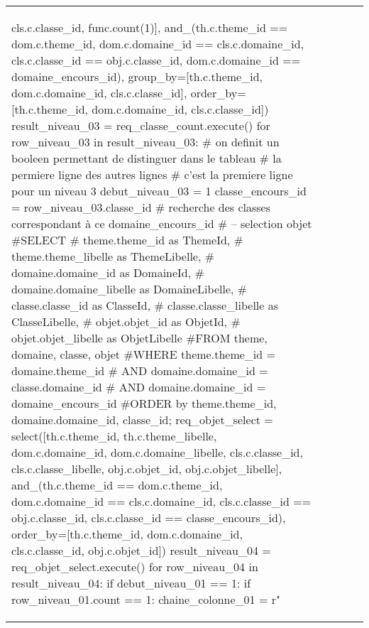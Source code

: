 \documentclass[12pt,titlepage,oneside]{book}
\begin{document}
\begin{supertabular}{|p{7.5cm}|p{7.5cm}|p{7.5cm}|c|p{10cm}|}
\begin{lbdpython}
                                 cls.c.classe_id, func.count(1)],
                         and_(th.c.theme_id == dom.c.theme_id,
                              dom.c.domaine_id == cls.c.domaine_id,
                              cls.c.classe_id == obj.c.classe_id,
                              dom.c.domaine_id == domaine_encours_id),
                         group_by=[th.c.theme_id, dom.c.domaine_id, cls.c.classe_id],
                         order_by=[th.c.theme_id, dom.c.domaine_id, cls.c.classe_id])
      result_niveau_03 = req_classe_count.execute()
      for row_niveau_03 in result_niveau_03:
         # on definit un booleen permettant de distinguer dans le tableau
         # la permiere ligne des autres lignes
         # c'est la premiere ligne pour un niveau 3
         debut_niveau_03 = 1
         classe_encours_id = row_niveau_03.classe_id
         # recherche des classes correspondant à ce domaine_encours_id
         # -- selection objet
         #SELECT
         #   theme.theme_id as ThemeId,
         #   theme.theme_libelle as ThemeLibelle,
         #   domaine.domaine_id as DomaineId,
         #   domaine.domaine_libelle as DomaineLibelle,
         #   classe.classe_id as ClasseId,
         #   classe.classe_libelle as ClasseLibelle,
         #   objet.objet_id as ObjetId,
         #   objet.objet_libelle as ObjetLibelle
         #FROM theme, domaine, classe, objet
         #WHERE theme.theme_id = domaine.theme_id
         #  AND domaine.domaine_id = classe.domaine_id
         #  AND domaine.domaine_id = domaine_encours_id
         #ORDER by theme.theme_id, domaine.domaine_id, classe_id;
         req_objet_select = select([th.c.theme_id, th.c.theme_libelle,
                                    dom.c.domaine_id, dom.c.domaine_libelle,
                                    cls.c.classe_id, cls.c.classe_libelle,
                                    obj.c.objet_id, obj.c.objet_libelle],
                              and_(th.c.theme_id == dom.c.theme_id,
                                   dom.c.domaine_id == cls.c.domaine_id,                              
                                   cls.c.classe_id == obj.c.classe_id,                              
                                   cls.c.classe_id == classe_encours_id),
                              order_by=[th.c.theme_id, dom.c.domaine_id, cls.c.classe_id, obj.c.objet_id])
         result_niveau_04 = req_objet_select.execute()
         for row_niveau_04 in result_niveau_04:
            if debut_niveau_01 == 1:
               if row_niveau_01.count == 1:
                  chaine_colonne_01 = r"%

\end{lbdpython}
\end{supertabular}
\end{document}
